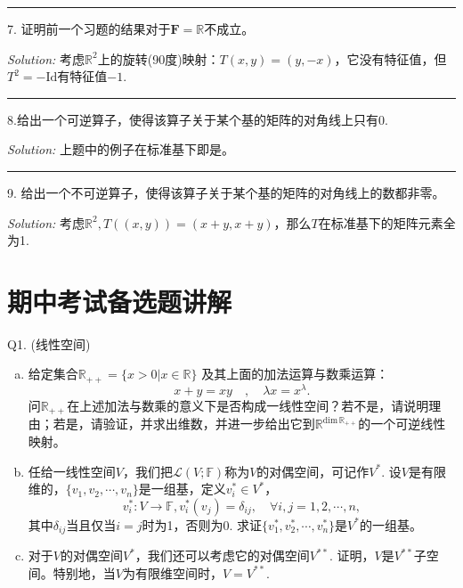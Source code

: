 \documentclass[a4[paper]{article}
\newcommand\R{\mathbb{R}}  %
\def\sep{\bigskip
\noindent{}\rule{\textwidth}{0.1mm}
\bigskip}
\begin{document}
\sep

\noindent{} 7. 证明前一个习题的结果对于$\mathbf{F}=\mathbb{R}$不成立。

\smallskip

\noindent{}\emph{Solution:} 考虑$\R^2$上的旋转(90度)映射：$T(x,y) = (y,-x)$，它没有特征值，但$T^2 = -\mathrm{Id}$有特征值$-1$.

\sep 

\noindent{} 8.给出一个可逆算子，使得该算子关于某个基的矩阵的对角线上只有$0$.

\smallskip

\noindent{} \emph{Solution:} 上题中的例子在标准基下即是。

\sep

\noindent{} 9. 给出一个不可逆算子，使得该算子关于某个基的矩阵的对角线上的数都非零。

\smallskip

\noindent{}\emph{Solution:} 考虑$\R^2, T((x,y)) = (x+y,x+y)$，那么$T$在标准基下的矩阵元素全为1. 


\section{期中考试备选题讲解}
\noindent{} Q1. (线性空间)
\begin{enumerate}[(a).]
\item 给定集合$\mathbb{R}_{++}=\{x>0|x\in\mathbb{R}\}$ 及其上面的加法运算与数乘运算：
\[x+y = xy\quad, \quad\lambda x= x^{\lambda}.\]
问$\mathbb{R}_{++}$在上述加法与数乘的意义下是否构成一线性空间？若不是，请说明理由；若是，请验证，并求出维数，并进一步给出它到$\mathbb{R}^{\mathrm{dim}\, \mathbb{R}_{++}}$的一个可逆线性映射。
\item 任给一线性空间$V$，我们把$\mathcal{L}(V;\mathbb{F})$称为$V$的对偶空间，可记作$V^*$. 设$V$是有限维的，$\{v_1,v_2,\cdots,v_n\}$是一组基，定义$v_i^*\in V^*$，
\[v_i^*:V\rightarrow \mathbb{F}, v_i^*(v_j) = \delta_{ij},\quad\forall i,j=1,2,\cdots,n,\]
其中$\delta_{ij}$当且仅当$i=j$时为1，否则为0. 求证$\{v_1^*,v_2^*,\cdots,v_n^*\}$是$V^*$的一组基。
\item 对于$V$的对偶空间$V^*$，我们还可以考虑它的对偶空间$V^{**}$. 证明，$V$是$V^{**}$子空间。特别地，当$V$为有限维空间时，$V=V^{**}$. 
\end{enumerate}
\end{document}
